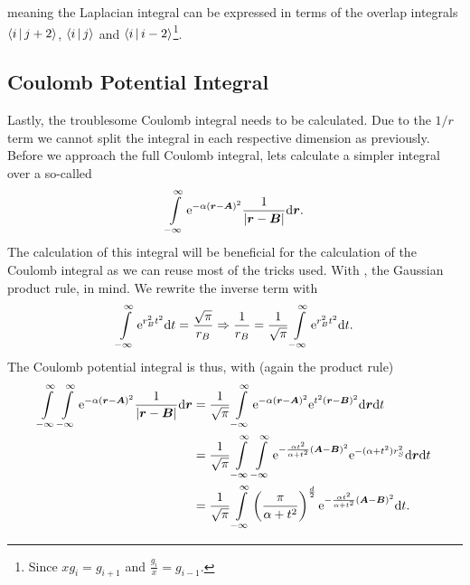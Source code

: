     meaning the Laplacian integral can be expressed in terms of the overlap
    integrals $\Braket{i|j+2}$, $\Braket{i|j}$ and
    $\Braket{i|i-2}$\footnote{Since $xg_i=g_{i+1}$ and
    $\frac{g_i}{x}=g_{i-1}$.}.

\subsection{Coulomb Potential Integral}
    Lastly, the troublesome Coulomb integral needs to be calculated. Due to the
    $1/r$ term we cannot split the integral in each respective dimension as
    previously. Before we approach the full Coulomb integral, lets calculate a
    simpler integral over a so-called 
        \begin{equation}
            \int\limits^{\infty}_{-\infty} \mathrm{e}^{-\alpha\left(\boldsymbol{{r}} - \boldsymbol{{A}}\right)^2}
            \frac{1}{\abs{\boldsymbol{{r}} - \boldsymbol{{B}}}} \mathrm{d}\boldsymbol{{r}}.
        \end{equation}
    The calculation of this integral will be beneficial for the calculation of
    the Coulomb integral as we can reuse most of the tricks used. With
    , the Gaussian product rule, in mind. We
    rewrite the inverse term with
        \begin{equation}
            \int\limits^{\infty}_{-\infty} \mathrm{e}^{r^2_B t^2} \mathrm{d} t = \frac{\sqrt{\pi}}{r_B} \Rightarrow
            \frac{1}{r_B} = \frac{1}{\sqrt{\pi}} \int\limits^{\infty}_{-\infty} \mathrm{e}^{r^2_Bt^2} \mathrm{d} t.
            \label{eq:onelectronTrick1}
        \end{equation}
    The Coulomb potential integral is thus, with
    (again the product rule)
        \begin{align}
            \int\limits^{\infty}_{-\infty}\int\limits^{\infty}_{-\infty} \mathrm{e}^{-\alpha\left(\boldsymbol{{r}} - \boldsymbol{{A}}\right)^2}
            \frac{1}{\abs{\boldsymbol{{r}} - \boldsymbol{{B}}}} \mathrm{d}\boldsymbol{{r}} &=
            \frac{1}{\sqrt{\pi}}\int\limits^{\infty}_{-\infty} \mathrm{e}^{-\alpha\left(\boldsymbol{{r}} -
            \boldsymbol{{A}}\right)^2} \mathrm{e}^{t^2(\boldsymbol{{r}} - \boldsymbol{{B}})^2} \mathrm{d}\boldsymbol{{r}} \mathrm{d}
            t \nonumber \\
            &= \frac{1}{\sqrt{\pi}} \int\limits^{\infty}_{-\infty}\int\limits^{\infty}_{-\infty} \mathrm{e}^{-\frac{\alpha
            t^2}{\alpha + t^2}\left(\boldsymbol{{A}} - \boldsymbol{{B}}\right)^2}
            \mathrm{e}^{-(\alpha+t^2)r^2_S} \mathrm{d}\boldsymbol{{r}} \mathrm{d} t \nonumber \\
            &= \frac{1}{\sqrt{\pi}} \int\limits^{\infty}_{-\infty} \left(\frac{\pi}{\alpha +
            t^2}\right)^{\frac{d}{2}} \mathrm{e}^{-\frac{\alpha t^2}{\alpha +
            t^2}\left(\boldsymbol{{A}} - \boldsymbol{{B}}\right)^2} \mathrm{d} t.
            \label{eq:coulombPotentialIntegral}
        \end{align}
